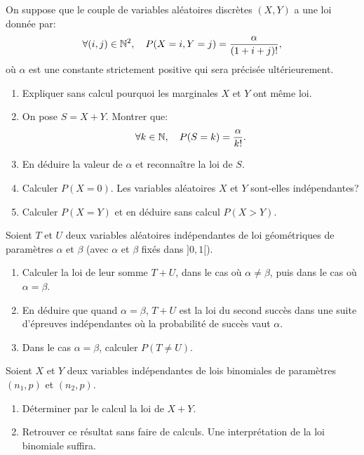 \documentclass[a4paper,12pt,reqno]{amsart}
\begin{document}
\begin{exo}

  On suppose que le couple de variables aléatoires discrètes $(X,Y)$ a une loi donnée par:
    $$
      \forall (i,j)\in\mathbb{N}^{2},\quad P(X=i, Y=j)=\frac{\alpha}{(1+i+j)!},
    $$
  où $\alpha$ est une constante strictement positive qui sera précisée ultérieurement.
  \begin{enumerate}
    \item Expliquer sans  calcul pourquoi les marginales $X$ et $Y$ ont même loi.
    \item On pose $S=X+Y$. Montrer que:
      $$
        \forall k\in\mathbb{N},\quad P(S=k)=\frac{\alpha}{k!}.
      $$
    \item En déduire la valeur de $\alpha$ et reconnaître la loi de $S$.
    \item Calculer $P(X=0)$. Les variables aléatoires $X$ et $Y$ sont-elles indépendantes?
    \item Calculer $P(X=Y)$ et en déduire sans calcul $P(X>Y)$.
  \end{enumerate}

\end{exo}

\begin{exo}

  Soient $T$ et $U$  deux variables aléatoires indépendantes de loi géométriques de paramètres $\alpha$ et $\beta$ (avec $\alpha$ et $\beta$ fixés dans $]0,1[$).
  \begin{enumerate}
    \item Calculer la loi de leur somme $T+U$, dans le cas où $\alpha\neq\beta$, puis dans le cas où $\alpha=\beta$.
    \item En déduire que quand $\alpha=\beta$, $T+U$ est la loi du second succès dans une suite d'épreuves indépendantes où la probabilité de succès vaut $\alpha$.
    \item Dans le cas $\alpha=\beta$, calculer $P(T \neq U)$.
  \end{enumerate}

\end{exo}

\begin{exo}

  Soient $X$ et $Y$ deux variables indépendantes de lois  binomiales de paramètres $(n_1,p)$ et $(n_2,p)$.
  \begin{enumerate}
    \item Déterminer par le calcul la loi de $X+Y$.
    \item Retrouver ce résultat sans faire de calculs. Une interprétation de la loi binomiale suffira.
  \end{enumerate}

\end{exo}
\end{document}
